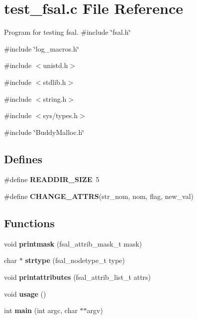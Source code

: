 \section{test\_\-fsal.c File Reference}
\label{test__fsal_8c}


Program for testing fsal.  
{\ttfamily \#include \char`\"{}fsal.h\char`\"{}}\par
{\ttfamily \#include \char`\"{}log\_\-macros.h\char`\"{}}\par
{\ttfamily \#include $<$unistd.h$>$}\par
{\ttfamily \#include $<$stdlib.h$>$}\par
{\ttfamily \#include $<$string.h$>$}\par
{\ttfamily \#include $<$sys/types.h$>$}\par
{\ttfamily \#include \char`\"{}BuddyMalloc.h\char`\"{}}\par
\subsection*{Defines}
\begin{DoxyCompactItemize}
\item 
\#define {\bfseries READDIR\_\-SIZE}~5\label{test__fsal_8c_a23f27c010a8ef80f23da9070400f3244}

\item 
\#define {\bfseries CHANGE\_\-ATTRS}(str\_\-nom, nom, flag, new\_\-val)
\end{DoxyCompactItemize}
\subsection*{Functions}
\begin{DoxyCompactItemize}
\item 
void {\bfseries printmask} (fsal\_\-attrib\_\-mask\_\-t mask)\label{test__fsal_8c_a97f533a652ce754b0d9faf4a52572e62}

\item 
char $\ast$ {\bfseries strtype} (fsal\_\-nodetype\_\-t type)\label{test__fsal_8c_a55da3e758cacb2e7378990063ef42124}

\item 
void {\bfseries printattributes} (fsal\_\-attrib\_\-list\_\-t attrs)\label{test__fsal_8c_a39093f42286fd46a5becd50e021cc4ae}

\item 
void {\bfseries usage} ()\label{test__fsal_8c_a2ef30c42cbc289d899a8be5d2d8f77d0}

\item 
int {\bfseries main} (int argc, char $\ast$$\ast$argv)\label{test__fsal_8c_a3c04138a5bfe5d72780bb7e82a18e627}

\end{DoxyCompactItemize}


